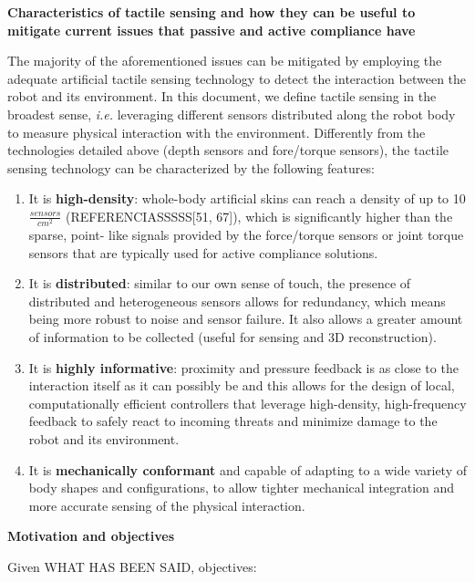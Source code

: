 \textbf{Characteristics of tactile sensing and how they can be useful to mitigate current issues that passive and active compliance have }

The majority of the aforementioned issues can be mitigated by employing the adequate artificial tactile sensing technology to detect the interaction between the robot and its environment. In this document, we define tactile sensing in the broadest sense, \textit{i.e.} leveraging different sensors distributed along the robot body to measure physical interaction with the environment. Differently from the technologies detailed above (depth sensors and fore/torque sensors), the tactile sensing technology can be characterized by the following features:

\begin{enumerate}
    \item It is \textbf{high-density}: whole-body artificial skins can reach a density of up to 10 $ \frac{sensors}{cm^2}$ (REFERENCIASSSSS[51, 67]), which is significantly higher than the sparse, point- like signals provided by the force/torque sensors or joint torque sensors that are typically used for active compliance solutions.
    \item It is \textbf{distributed}: similar to our own sense of touch, the presence of distributed and heterogeneous sensors allows for redundancy, which means being more robust to noise and sensor failure. It also allows a greater amount of information to be collected (useful for sensing and 3D reconstruction).
    \item It is \textbf{highly informative}: proximity and pressure feedback is as close to the interaction itself as it can possibly be and this allows for the design of local, computationally efficient controllers that leverage high-density, high-frequency feedback to safely react to incoming threats and minimize damage to the robot and its environment.
    \item It is \textbf{mechanically conformant} and capable of adapting to a wide variety of body shapes and configurations, to allow tighter mechanical integration and more accurate sensing of the physical interaction.
\end{enumerate}

\textbf{Motivation and objectives}

Given WHAT HAS BEEN SAID, objectives:

